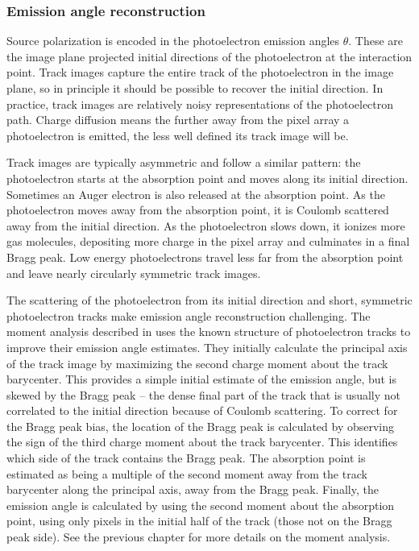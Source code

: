 \subsubsection{Emission angle reconstruction}
\label{sec:emit}
Source polarization is encoded in the photoelectron emission angles $\theta$. These are the image plane projected initial directions of the photoelectron at the interaction point. Track images capture the entire track of the photoelectron in the image plane, so in principle it should be possible to recover the initial direction.
In practice, track images are relatively noisy representations of the photoelectron path. Charge diffusion means the further away from the pixel array a photoelectron is emitted, the less well defined its track image will be.

Track images are typically asymmetric and follow a similar pattern: the photoelectron starts at the absorption point and moves along its initial direction. Sometimes an Auger electron is also released at the absorption point. As the photoelectron moves away from the absorption point, it is Coulomb scattered away from the initial direction. As the photoelectron slows down, it ionizes more gas molecules, depositing more charge in the pixel array and culminates in a final Bragg peak. Low energy photoelectrons travel less far from the absorption point and leave nearly circularly symmetric track images. %

The scattering of the photoelectron from its initial direction and short, symmetric photoelectron tracks make emission angle reconstruction challenging. The moment analysis described in \citet{bellazzini_novel_2003} uses the known structure of photoelectron tracks to improve their emission angle estimates. They initially calculate the principal axis of the track image by maximizing the second charge moment about the track barycenter. This provides a simple initial estimate of the emission angle, but is skewed by the Bragg peak -- the dense final part of the track that is usually not correlated to the initial direction because of Coulomb scattering. To correct for the Bragg peak bias, the location of the Bragg peak is calculated by observing the sign of the third charge moment about the track barycenter. This identifies which side of the track contains the Bragg peak. The absorption point is estimated as being a multiple of the second moment away from the track barycenter along the principal axis, away from the Bragg peak. Finally, the emission angle is calculated by using the second moment about the absorption point, using only pixels in the initial half of the track (those not on the Bragg peak side). See the previous chapter for more details on the moment analysis.

